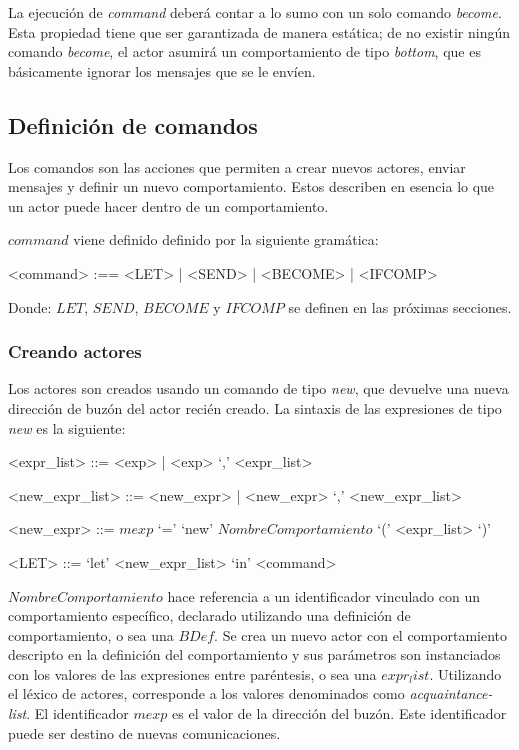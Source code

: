 La ejecución de \textit{command} deberá contar a lo sumo con un solo comando \textit{become}. Esta propiedad tiene que ser garantizada de manera estática; de no existir ningún comando \textit{become}, el actor asumirá un comportamiento de tipo \textit{bottom}, que es básicamente ignorar los mensajes que se le envíen.

\subsection{Definición de comandos}\label{actores:cmd}
Los comandos son las acciones que permiten a \SAL crear nuevos actores, enviar mensajes y definir un nuevo comportamiento. Estos describen en esencia lo que un actor puede hacer dentro de un comportamiento.

$command$ viene definido definido por la siguiente gramática:
\begin{grammar}
<command> :== <LET> | <SEND> | <BECOME> | <IFCOMP>
\end{grammar}

Donde: $LET$, $SEND$, $BECOME$ y $IFCOMP$ se definen en las próximas secciones.

\subsubsection*{Creando actores}
Los actores son creados usando un comando de tipo \textit{new}, que devuelve una nueva dirección de buzón del actor recién creado. La sintaxis de las expresiones de tipo \textit{new} es la siguiente:

\begin{grammar}
  <expr_list> ::= <exp> | <exp> `,' <expr_list>  

  <new_expr_list> ::= <new_expr> | <new_expr> `,' <new_expr_list>
  
  <new_expr> ::= $mexp$ `=' `new' $NombreComportamiento$ `(' <expr_list> `)'
  
  <LET> ::=  `let' <new_expr_list> `in' <command> 
\end{grammar}

$NombreComportamiento$ hace referencia a un identificador vinculado con un comportamiento específico, declarado utilizando una definición de comportamiento, o sea una $BDef$. Se crea un nuevo actor con el comportamiento descripto en la definición del comportamiento y sus parámetros son instanciados con los valores de las expresiones entre paréntesis, o sea una $expr_list$. Utilizando el léxico de actores, corresponde a los valores denominados como \textit{acquaintance-list}. El identificador $mexp$ es el valor de la dirección del buzón. Este identificador puede ser destino de nuevas comunicaciones. 

